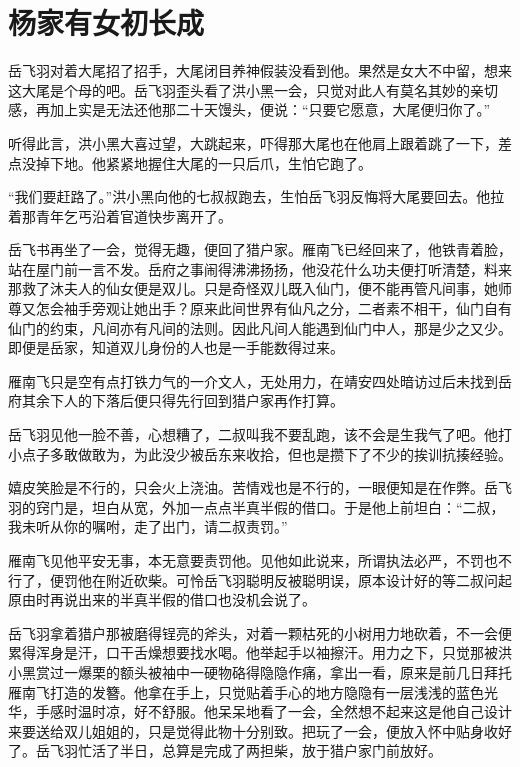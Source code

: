 \chapter{杨家有女初长成}
\label{chap:chen-jia-you-nv-chu-zhang-cheng}

岳飞羽对着大尾招了招手，大尾闭目养神假装没看到他。果然是女大不中留，想来这大尾是个母的吧。岳飞羽歪头看了洪小黑一会，只觉对此人有莫名其妙的亲切感，再加上实是无法还他那二十天馒头，便说：“只要它愿意，大尾便归你了。”

听得此言，洪小黑大喜过望，大跳起来，吓得那大尾也在他肩上跟着跳了一下，差点没掉下地。他紧紧地握住大尾的一只后爪，生怕它跑了。

“我们要赶路了。”洪小黑向他的七叔叔跑去，生怕岳飞羽反悔将大尾要回去。他拉着那青年乞丐沿着官道快步离开了。

岳飞书再坐了一会，觉得无趣，便回了猎户家。雁南飞已经回来了，他铁青着脸，站在屋门前一言不发。岳府之事闹得沸沸扬扬，他没花什么功夫便打听清楚，料来那救了沐夫人的仙女便是双儿。只是奇怪双儿既入仙门，便不能再管凡间事，她师尊又怎会袖手旁观让她出手？原来此间世界有仙凡之分，二者素不相干，仙门自有仙门的约束，凡间亦有凡间的法则。因此凡间人能遇到仙门中人，那是少之又少。即便是岳家，知道双儿身份的人也是一手能数得过来。

雁南飞只是空有点打铁力气的一介文人，无处用力，在靖安四处暗访过后未找到岳府其余下人的下落后便只得先行回到猎户家再作打算。

岳飞羽见他一脸不善，心想糟了，二叔叫我不要乱跑，该不会是生我气了吧。他打小点子多敢做敢为，为此没少被岳东来收拾，但也是攒下了不少的挨训抗揍经验。

嬉皮笑脸是不行的，只会火上浇油。苦情戏也是不行的，一眼便知是在作弊。岳飞羽的窍门是，坦白从宽，外加一点点半真半假的借口。于是他上前坦白：“二叔，我未听从你的嘱咐，走了出门，请二叔责罚。”

雁南飞见他平安无事，本无意要责罚他。见他如此说来，所谓执法必严，不罚也不行了，便罚他在附近砍柴。可怜岳飞羽聪明反被聪明误，原本设计好的等二叔问起原由时再说出来的半真半假的借口也没机会说了。

岳飞羽拿着猎户那被磨得锃亮的斧头，对着一颗枯死的小树用力地砍着，不一会便累得浑身是汗，口干舌燥想要找水喝。他举起手以袖擦汗。用力之下，只觉那被洪小黑赏过一爆栗的额头被袖中一硬物硌得隐隐作痛，拿出一看，原来是前几日拜托雁南飞打造的发簪。他拿在手上，只觉贴着手心的地方隐隐有一层浅浅的蓝色光华，手感时温时凉，好不舒服。他呆呆地看了一会，全然想不起来这是他自己设计来要送给双儿姐姐的，只是觉得此物十分别致。把玩了一会，便放入怀中贴身收好了。岳飞羽忙活了半日，总算是完成了两担柴，放于猎户家门前放好。

